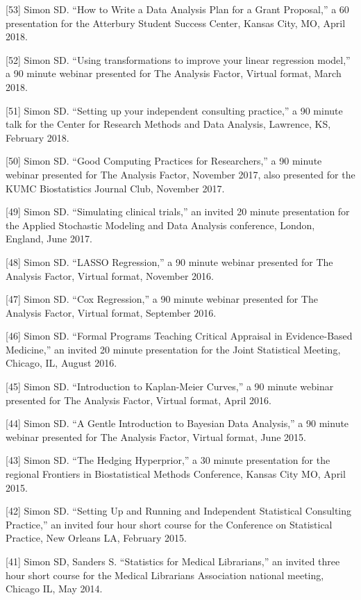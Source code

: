 \documentclass[
  12pt,
]{article}
\begin{document}
{[}53{]} Simon SD. ``How to Write a Data Analysis Plan for a Grant
Proposal,'' a 60 presentation for the Atterbury Student Success Center,
Kansas City, MO, April 2018.

{[}52{]} Simon SD. ``Using transformations to improve your linear
regression model,'' a 90 minute webinar presented for The Analysis
Factor, Virtual format, March 2018.

{[}51{]} Simon SD. ``Setting up your independent consulting practice,''
a 90 minute talk for the Center for Research Methods and Data Analysis,
Lawrence, KS, February 2018.

{[}50{]} Simon SD. ``Good Computing Practices for Researchers,'' a 90
minute webinar presented for The Analysis Factor, November 2017, also
presented for the KUMC Biostatistics Journal Club, November 2017.

{[}49{]} Simon SD. ``Simulating clinical trials,'' an invited 20 minute
presentation for the Applied Stochastic Modeling and Data Analysis
conference, London, England, June 2017.

{[}48{]} Simon SD. ``LASSO Regression,'' a 90 minute webinar presented
for The Analysis Factor, Virtual format, November 2016.

{[}47{]} Simon SD. ``Cox Regression,'' a 90 minute webinar presented for
The Analysis Factor, Virtual format, September 2016.

{[}46{]} Simon SD. ``Formal Programs Teaching Critical Appraisal in
Evidence-Based Medicine,'' an invited 20 minute presentation for the
Joint Statistical Meeting, Chicago, IL, August 2016.

{[}45{]} Simon SD. ``Introduction to Kaplan-Meier Curves,'' a 90 minute
webinar presented for The Analysis Factor, Virtual format, April 2016.

{[}44{]} Simon SD. ``A Gentle Introduction to Bayesian Data Analysis,''
a 90 minute webinar presented for The Analysis Factor, Virtual format,
June 2015.

{[}43{]} Simon SD. ``The Hedging Hyperprior,'' a 30 minute presentation
for the regional Frontiers in Biostatistical Methods Conference, Kansas
City MO, April 2015.

{[}42{]} Simon SD. ``Setting Up and Running and Independent Statistical
Consulting Practice,'' an invited four hour short course for the
Conference on Statistical Practice, New Orleans LA, February 2015.

{[}41{]} Simon SD, Sanders S. ``Statistics for Medical Librarians,'' an
invited three hour short course for the Medical Librarians Association
national meeting, Chicago IL, May 2014.
\end{document}

